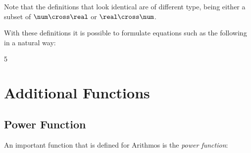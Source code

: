 \documentclass[12pt]{article}
\begin{document}
{}
Note that the definitions that look identical are of different type,
being either a subset of $\num \cross \real$ or $\real \cross \num$.

With these definitions it is possible to formulate equations such as
the following in a natural way:
\begin{zed}
  5 \azlta \aten {}
\end{zed}

%
\section{Additional Functions}
\label{sec:additional-functions}

\subsection{Power Function}
\label{sec:power-function}
An important function that is defined for Arithmos is the \emph{power
  function}:
%
\end{document}
